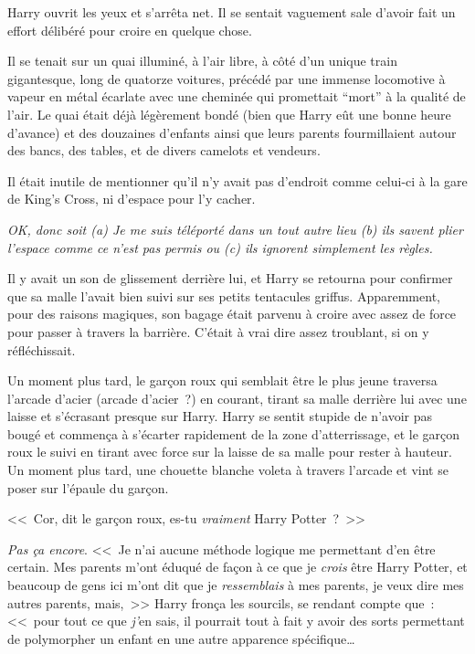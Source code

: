 Harry ouvrit les yeux et s'arrêta net. Il se sentait vaguement sale d'avoir fait un effort délibéré pour croire en quelque chose.

Il se tenait sur un quai illuminé, à l'air libre, à côté d'un unique train gigantesque, long de quatorze voitures, précédé par une immense locomotive à vapeur en métal écarlate avec une cheminée qui promettait “mort” à la qualité de l'air. Le quai était déjà légèrement bondé (bien que Harry eût une bonne heure d'avance) et des douzaines d'enfants ainsi que leurs parents fourmillaient autour des bancs, des tables, et de divers camelots et vendeurs.

Il était inutile de mentionner qu'il n'y avait pas d'endroit comme celui-ci à la gare de King's Cross, ni d'espace pour l'y cacher.

\emph{OK, donc soit (a) Je me suis téléporté dans un tout autre lieu (b) ils savent plier l'espace comme ce n'est pas permis ou (c) ils ignorent simplement les règles.}

Il y avait un son de glissement derrière lui, et Harry se retourna pour confirmer que sa malle l'avait bien suivi sur ses petits tentacules griffus. Apparemment, pour des raisons magiques, son bagage était parvenu à croire avec assez de force pour passer à travers la barrière. C'était à vrai dire assez troublant, si on y réfléchissait.

Un moment plus tard, le garçon roux qui semblait être le plus jeune traversa l'arcade d'acier (arcade d'acier~?) en courant, tirant sa malle derrière lui avec une laisse et s'écrasant presque sur Harry. Harry se sentit stupide de n'avoir pas bougé et commença à s'écarter rapidement de la zone d'atterrissage, et le garçon roux le suivi en tirant avec force sur la laisse de sa malle pour rester à hauteur. Un moment plus tard, une chouette blanche voleta à travers l'arcade et vint se poser sur l'épaule du garçon.

<<~Cor, dit le garçon roux, es-tu \emph{vraiment} Harry Potter~?~>>

\emph{Pas ça encore}. <<~Je n'ai aucune méthode logique me permettant d'en être certain. Mes parents m'ont éduqué de façon à ce que je \emph{crois} être Harry Potter, et beaucoup de gens ici m'ont dit que je \emph{ressemblais} à mes parents, je veux dire mes autres parents, mais,~>> Harry fronça les sourcils, se rendant compte que~: <<~pour tout ce que \emph{j'}en sais, il pourrait tout à fait y avoir des sorts permettant de polymorpher un enfant en une autre apparence spécifique…

